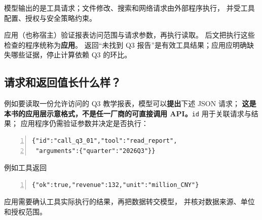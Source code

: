 模型输出的是工具请求；文件修改、搜索和网络请求由外部程序执行，
并受工具配置、授权与安全策略约束。

应用（也称宿主）验证报表访问范围与请求参数，再执行读取。
后文把执行这些检查的程序统称为\textbf{应用}。
返回“未找到 Q3 报告”是有效工具结果；应用应明确缺失哪些证据，停止计算依赖 Q3 的环比。

\subsection{请求和返回值长什么样？}

例如要读取一份允许访问的 Q3 教学报表，模型可以\textbf{提出}下述 JSON 请求；
\textbf{这是本书的应用层示意格式，不是任一厂商的可直接调用 API。}\texttt{id} 用于关联请求与结果；
应用程序仍需验证参数并决定是否执行：
\begin{tcolorbox}[colback=paper,colframe=linegray,boxrule=.5pt,arc=1mm,left=3mm,right=3mm]
\begin{Verbatim}[numbers=left,numbersep=4pt,fontsize=\footnotesize]
{"id":"call_q3_01","tool":"read_report",
 "arguments":{"quarter":"2026Q3"}}
\end{Verbatim}
\end{tcolorbox}
例如工具返回
\begin{tcolorbox}[colback=paper,colframe=linegray,boxrule=.5pt,arc=1mm,left=3mm,right=3mm]
\begin{Verbatim}[numbers=left,numbersep=4pt,fontsize=\footnotesize]
{"ok":true,"revenue":132,"unit":"million_CNY"}
\end{Verbatim}
\end{tcolorbox}
应用需要确认工具实际执行的结果，再把数据转交模型，
并核对数据来源、单位和授权范围。


